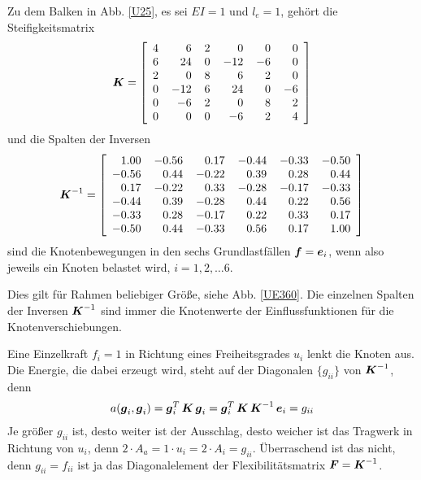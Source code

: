 Zu dem Balken in Abb. \ref{U25}, es sei $EI = 1$ und $l_e = 1$, geh\"{o}rt die Steifigkeitsmatrix
\begin{align}
\vek K = \left[ \barr {r @{\hspace{4mm}}r @{\hspace{4mm}}r
@{\hspace{4mm}}r @{\hspace{4mm}}r @{\hspace{4mm}}r}
4    & 6    & 2    & 0   &  0     &0\\
     6    & 24    &  0   & -12    & -6     &0\\
     2    &  0    &  8   &   6   &   2     &0\\
     0   & -12    &  6   &  24   &   0    &-6\\
     0   &  -6    &  2   &  0    &  8     &2\\
     0   &   0    &  0   &  -6    &  2   &  4
    \earr \right]
\end{align}
und die Spalten der Inversen
\begin{align}
\vek K^{-1} = \left[ \barr {r @{\hspace{4mm}}r @{\hspace{4mm}}r
@{\hspace{4mm}}r @{\hspace{4mm}}r @{\hspace{4mm}}r}
 1.00  &-0.56   & 0.17  & -0.44  & -0.33  & -0.50\\
   -0.56  & 0.44   &-0.22  &  0.39   & 0.28   & 0.44\\
    0.17   &-0.22   & 0.33  & -0.28   &-0.17  & -0.33\\
   -0.44  & 0.39  & -0.28  &  0.44   & 0.22  &  0.56\\
   -0.33   & 0.28  & -0.17  &  0.22   & 0.33  &  0.17\\
   -0.50   & 0.44  & -0.33  &  0.56  &  0.17  &  1.00
    \earr \right]
    \end{align}
sind die Knotenbewegungen in den sechs Grundlastf\"{a}llen $\mbox{\boldmath $f$} = \mbox{\boldmath $e$}_i$, wenn also jeweils ein Knoten belastet wird, $i = 1,2,\ldots 6$.

Dies gilt f\"{u}r Rahmen beliebiger Gr\"{o}{\ss}e, siehe Abb. \ref{UE360}. Die einzelnen Spalten der Inversen $\mbox{\boldmath $K$}^{-1}$ sind immer die Knotenwerte der Einflussfunktionen f\"{u}r die Knotenverschiebungen.

Eine Einzelkraft $f_i = 1$ in Richtung eines Freiheitsgrades $u_i$ lenkt die Knoten aus. Die Energie, die dabei erzeugt wird, steht auf der Diagonalen $\{g_{ii}\}$ von $\mbox{\boldmath $K$}^{-1}$, denn
\begin{align}
a(\mbox{\boldmath $g$}_i, \mbox{\boldmath $g$}_i) = \mbox{\boldmath $g$}_i^T\,\mbox{\boldmath $K$}\,\mbox{\boldmath $g$}_i = \mbox{\boldmath $g$}_i^T\,\mbox{\boldmath $K$}\,\mbox{\boldmath $K$}^{-1}\,\mbox{\boldmath $e$}_i = g_{ii}
\end{align}
Je gr\"{o}{\ss}er $g_{ii}$ ist, desto weiter ist der Ausschlag, desto weicher ist das Tragwerk in Richtung von $u_i$, denn $2 \cdot A_a = 1 \cdot u_i = 2 \cdot A_i = g_{ii}$. \"{U}berraschend ist das nicht, denn $g_{ii} = f_{ii}$ ist ja das Diagonalelement der Flexibilit\"{a}tsmatrix $\mbox{\boldmath $F$} = \mbox{\boldmath $K$}^{-1}$.

